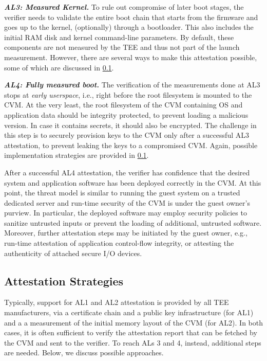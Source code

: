 \noindent\textbf{\emph{AL3: Measured Kernel.}}
%
To rule out compromise of later boot stages, the verifier needs to validate the
entire boot chain that starts from the firmware and goes up to the kernel,
(optionally) through a bootloader. This also includes the initial RAM disk and
kernel command-line parameters. By default, these components are not measured by
the \ac{TEE} and thus not part of the launch measurement. However, there are
several ways to make this attestation possible, some of which are discussed in
\cref{section:att-examples}.

\noindent\textbf{\emph{AL4: Fully measured boot.}}
%
The verification of the measurements done at AL3 stops at \emph{early
userspace}, i.e., right before the root filesystem is mounted to the \ac{CVM}.
At the very least, the root filesystem of the \ac{CVM} containing OS and
application data should be integrity protected, to prevent loading a malicious
version. In case it contains secrets, it should also be encrypted. The challenge
in this step is to securely provision keys to the \ac{CVM} only after a
successful AL3 attestation, to prevent leaking the keys to a compromised
\ac{CVM}. Again, possible implementation strategies are provided in
\cref{section:att-examples}.

After a successful AL4 attestation, the verifier has confidence that the desired
system and application software has been deployed correctly in the \ac{CVM}. At
this point, the threat model is similar to running the guest system on a trusted
dedicated server and run-time security of the \ac{CVM} is under the guest
owner's purview. In particular, the deployed software may employ security
policies to sanitize untrusted inputs or prevent the loading of additional,
untrusted software. Moreover, further attestation steps may be initiated by the
guest owner, e.g., run-time attestation of application control-flow integrity,
or attesting the authenticity of attached secure I/O devices.

\subsection{Attestation Strategies}
\label{section:att-examples}

Typically, support for AL1 and AL2 attestation is provided by all \ac{TEE}
manufacturers, via a certificate chain and a public key infrastructure (for AL1)
and a a measurement of the initial memory layout of the \ac{CVM} (for AL2). In
both cases, it is often sufficient to verify the attestation report that can be
fetched by the \ac{CVM} and sent to the verifier. To reach ALs 3 and 4, instead,
additional steps are needed. Below, we discuss possible approaches.

